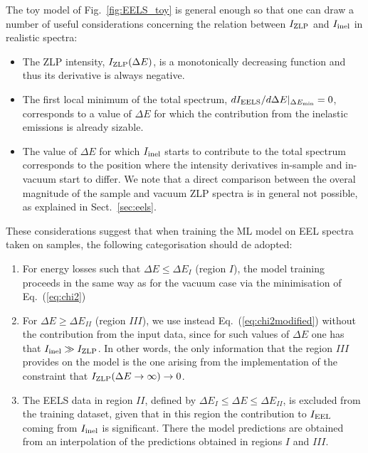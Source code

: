 The toy model of Fig.~\ref{fig:EELS_toy} is general enough so that one can draw
a number of useful considerations concerning the relation between $I_{\rm ZLP}$ and $I_{\rm inel}$
in realistic spectra:

\begin{itemize}

\item The ZLP intensity, $I_{\rm ZLP}(\Delta E)$, is a monotonically decreasing function
  and thus its derivative is always negative.

\item  The first local minimum of the total spectrum, $dI_{\rm EELS}/d\Delta E|_{\Delta E_{\rm min}}=0$, corresponds
  to a value of $\Delta E$ for which the contribution from the inelastic emissions is already
  sizable.

\item The value of $\Delta E$ for which $I_{\rm inel}$ starts to contribute to the total spectrum
  corresponds to the position where the intensity derivatives in-sample and in-vacuum  start to differ.
  We note that a direct comparison between the overal magnitude of the sample and vacuum ZLP
  spectra is in general not possible, as explained in Sect.~\ref{sec:eels}. 
\end{itemize}

These considerations suggest that when training the ML model on EEL spectra taken on samples,
the following categorisation should de adopted:

\begin{enumerate}

\item For energy losses such that $\Delta E \le \Delta E_I$ (region $I$),
  the model training  proceeds in the same way as for the vacuum case
  via the minimisation of Eq.~(\ref{eq:chi2})

\item  
  For $\Delta E \ge \Delta E_{II}$ (region $III$), we use instead Eq.~(\ref{eq:chi2modified})
  without the contribution from the input data, since for such values
  of $\Delta E$ one has that $I_{\rm inel}\gg I_{\rm ZLP}$.
  In other words, the only information that the region $III$ provides
  on the model is the one arising from the implementation
  of the constraint that $I_{\rm ZLP}(\Delta E\to \infty)\to 0$.

\item The EELS data  in region $II$, defined by  $\Delta E_I \le \Delta E \le \Delta E_{II}$,
  is excluded from the training dataset, given that in this region the contribution to $I_{\rm EEL}$
  coming from $I_{\rm inel}$ is significant.
  There the model predictions are obtained from an interpolation
  of the predictions obtained in regions $I$ and $III$.

\end{enumerate}

